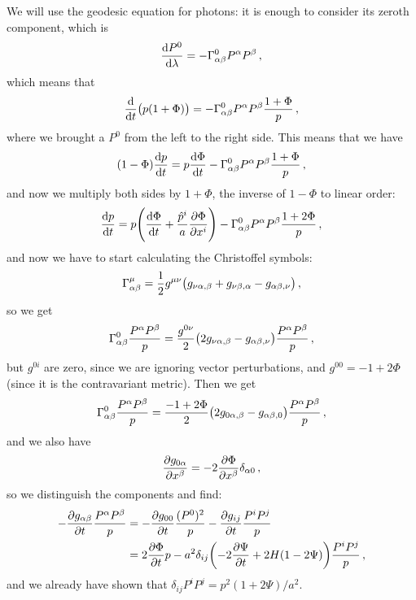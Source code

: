 \documentclass[main.tex]{subfiles}
\begin{document}
We will use the geodesic equation for photons: it is enough to consider its zeroth component, which is 
%
\begin{align}
\dv{P^{0}}{\lambda } = - \Gamma^{0}_{\alpha \beta } P^{\alpha } P^{\beta }
\,,
\end{align}
%
which means that 
%
\begin{align}
\dv{}{t} \qty(p (1+ \Phi )) = - \Gamma^{0}_{\alpha \beta } P^{\alpha } P^{\beta } \frac{1+\Phi }{p}
\,,
\end{align}
%
where we brought a \(P^{0}\) from the left to the right side. This means that we have 
%
\begin{align}
(1-\Phi ) \dv{p}{t} 
= p \dv{\Phi }{t} - \Gamma^{0}_{\alpha \beta } 
P^{\alpha } P^{\beta } \frac{1+\Phi }{p}
\,,
\end{align}
%
and now we multiply both sides by \(1+\Phi \), the inverse of \(1 - \Phi \) to linear order: 
%
\begin{align}
\dv{p}{t} = p \qty(\dv{\Phi }{t} + \frac{\hat{p}^{i}  }{a} \pdv{\Phi }{x^{i}}) 
- \Gamma^{0}_{\alpha \beta } P^{\alpha } P^{\beta } \frac{1+2\Phi }{p}
\,,
\end{align}
%
and now we have to start calculating the Christoffel symbols: 
%
\begin{align}
\Gamma^{\mu }_{\alpha \beta } = \frac{1}{2} g^{\mu \nu } \qty(g_{\nu \alpha , \beta } + g_{\nu \beta , \alpha } - g_{\alpha \beta , \nu })
\,,
\end{align}
%
so we get 
%
\begin{align}
\Gamma^{0}_{\alpha \beta } \frac{P^{\alpha }P^{\beta }}{p}
= \frac{g^{0\nu }}{2} \qty(2 g_{\nu \alpha , \beta } - g_{\alpha \beta , \nu }) \frac{P^{\alpha }P^{\beta }}{p}
\,,
\end{align}
%
but \(g^{0i}\) are zero, since we are ignoring vector perturbations, and \(g^{00} = -1 + 2\Phi \) (since it is the contravariant metric). Then we get 
%
\begin{align}
\Gamma^{0}_{\alpha \beta } \frac{P^{\alpha }P^{\beta }}{p}
= \frac{-1 + 2 \Phi }{2} \qty(2 g_{0 \alpha , \beta } - g_{\alpha \beta , 0 }) \frac{P^{\alpha }P^{\beta }}{p}
\,,
\end{align}
%
and we also have 
%
\begin{align}
\pdv{g_{0 \alpha }}{x^{\beta }}
= - 2 \pdv{\Phi }{x^{\beta }} \delta_{\alpha 0}
\,,
\end{align}
%
so we distinguish the components and find: 
%
\begin{subequations}
\begin{align}
- \pdv{g_{\alpha \beta }}{t} \frac{P^{\alpha } P^{\beta }}{p} &= - \pdv{g_{00} }{t} \frac{(P^{0})^2}{p} - \pdv{g_{ij}}{t} \frac{P^{i} P^{j}}{p} \\
&= 2 \pdv{\Phi }{t} p - a^2 \delta_{ij} \qty(-2 \pdv{\Psi }{t} + 2 H (1- 2 \Psi )) \frac{P^{i} P^{j}}{p}
\,,
\end{align}
\end{subequations}
%
and we already have shown that \(\delta_{ij} P^{i} P^{j} = p^2 (1 + 2 \Psi ) / a^2\).
\end{document}
